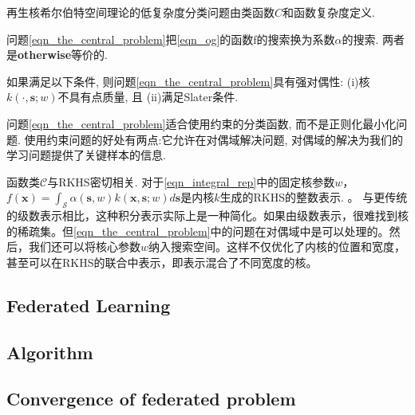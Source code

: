再生核希尔伯特空间理论的低复杂度分类问题由类函数$C$和函数复杂度定义.
问题\eqref{eqn_the_central_problem}把\eqref{eqn_og}的函数f的搜索换为系数$\alpha$的搜索. 两者是\textbf{otherwise}等价的.

\begin{theorem}\label{th:zero_duality}
    如果满足以下条件, 则问题\eqref{eqn_the_central_problem}具有强对偶性:
    (i)核$k(\cdot,\mathbf{s};w)$不具有点质量, 且
    (ii)满足Slater条件.
\end{theorem}


\begin{remark}\normalfont
    问题\eqref{eqn_the_central_problem}适合使用约束的分类函数, 而不是正则化最小化问题. 使用约束问题的好处有两点:它允许在对偶域解决问题, 对偶域的解决为我们的学习问题提供了关键样本的信息.
\end{remark}

\begin{remark}\normalfont
    函数类$\mathcal{C}$与RKHS密切相关. 对于\eqref{eqn_integral_rep}中的固定核参数$w$， $f(\mathbf{x}) = \int_{\mathcal{S}} \alpha(\mathbf{s},w) k(\mathbf{x},\mathbf{s}; w) d\mathbf{s}$是内核$k$生成的RKHS的整数表示. \cite{peifer2018locally, peifer2019sparse, peifer2020sparse}。
    与更传统的级数表示相比，这种积分表示实际上是一种简化。如果由级数表示，很难找到核的稀疏集。但\eqref{eqn_the_central_problem}中的问题在对偶域中是可以处理的。然后，我们还可以将核心参数$w$纳入搜索空间。这样不仅优化了内核的位置和宽度，甚至可以在RKHS的联合中表示，即表示混合了不同宽度的核\cite{peifer2020sparse}。


\end{remark}

\subsection{Federated Learning}
\label{sec:prob_form}

\subsection{Algorithm}
\label{sec:Algorithm}

\subsection{Convergence of federated problem}
\label{sec:optimality}
